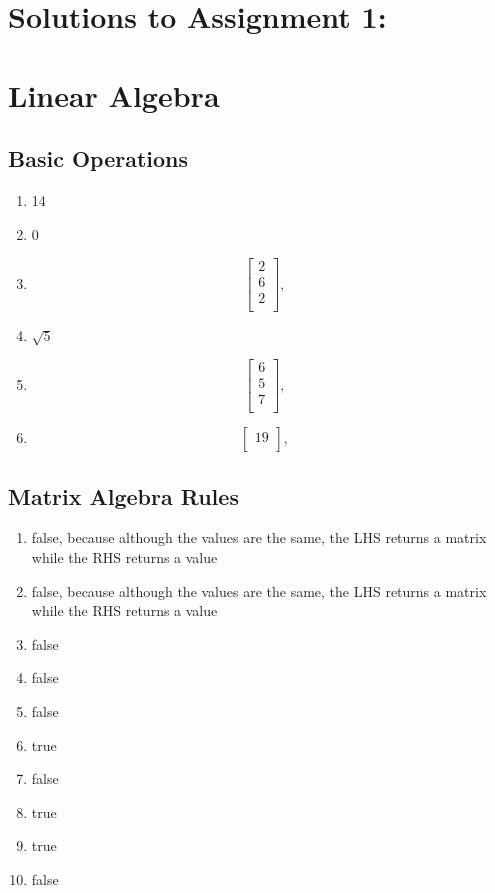 \documentclass[letterpaper,12pt]{article}
\begin{document}
    \section*{Solutions to Assignment 1:}
    
    
    \section{Linear Algebra}
    \subsection{Basic Operations}
    \begin{enumerate}
     \item 14
     \item 0
     \item \[
        \left[\begin{array}{c}
        2\\
        6\\
        2\\
        \end{array}\right], \quad
    \]
     \item $\sqrt{5}$
    \item \[
        \left[\begin{array}{c}
        6\\
        5\\
        7\\
        \end{array}\right], \quad
    \]
    \item \[
        \left[\begin{array}{c}
        19\\
        \end{array}\right], \quad
    \]
    \end{enumerate}
    \subsection{Matrix Algebra Rules}
    \begin{enumerate}
        \item false, because although the values are the same, the LHS returns a matrix while the RHS returns a value
        \item false, because although the values are the same, the LHS returns a matrix while the RHS returns a value
        \item false
        \item false
        \item false 
        \item true
        \item false
        \item true
        \item true
        \item false
    \end{enumerate}
    
\end{document}
